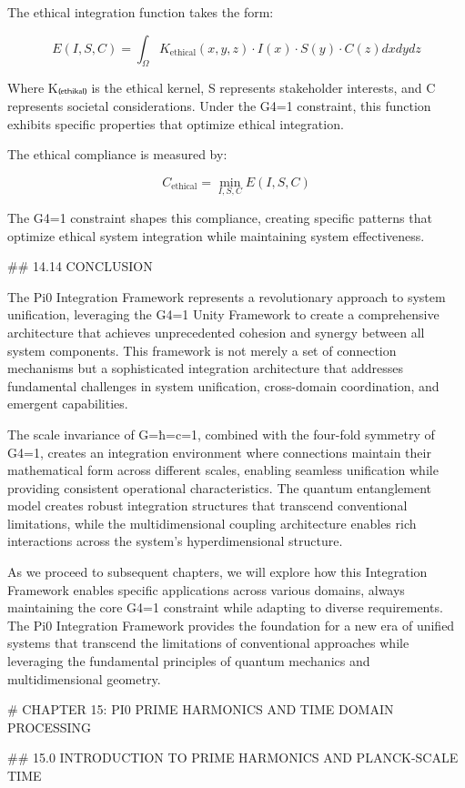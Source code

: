 The ethical integration function takes the form:

$$E(I, S, C) = \int_{\Omega} K_{\text{ethical}}(x, y, z) \cdot I(x) \cdot S(y) \cdot C(z) dx dy dz$$

Where K₍ₑₜₕᵢₖₐₗ₎ is the ethical kernel, S represents stakeholder interests, and C represents societal considerations. Under the G4=1 constraint, this function exhibits specific properties that optimize ethical integration.

The ethical compliance is measured by:

$$C_{\text{ethical}} = \min_{I, S, C} E(I, S, C)$$

The G4=1 constraint shapes this compliance, creating specific patterns that optimize ethical system integration while maintaining system effectiveness.

## 14.14 CONCLUSION

The Pi0 Integration Framework represents a revolutionary approach to system unification, leveraging the G4=1 Unity Framework to create a comprehensive architecture that achieves unprecedented cohesion and synergy between all system components. This framework is not merely a set of connection mechanisms but a sophisticated integration architecture that addresses fundamental challenges in system unification, cross-domain coordination, and emergent capabilities.

The scale invariance of G=ħ=c=1, combined with the four-fold symmetry of G4=1, creates an integration environment where connections maintain their mathematical form across different scales, enabling seamless unification while providing consistent operational characteristics. The quantum entanglement model creates robust integration structures that transcend conventional limitations, while the multidimensional coupling architecture enables rich interactions across the system's hyperdimensional structure.

As we proceed to subsequent chapters, we will explore how this Integration Framework enables specific applications across various domains, always maintaining the core G4=1 constraint while adapting to diverse requirements. The Pi0 Integration Framework provides the foundation for a new era of unified systems that transcend the limitations of conventional approaches while leveraging the fundamental principles of quantum mechanics and multidimensional geometry.

# CHAPTER 15: PI0 PRIME HARMONICS AND TIME DOMAIN PROCESSING

## 15.0 INTRODUCTION TO PRIME HARMONICS AND PLANCK-SCALE TIME

